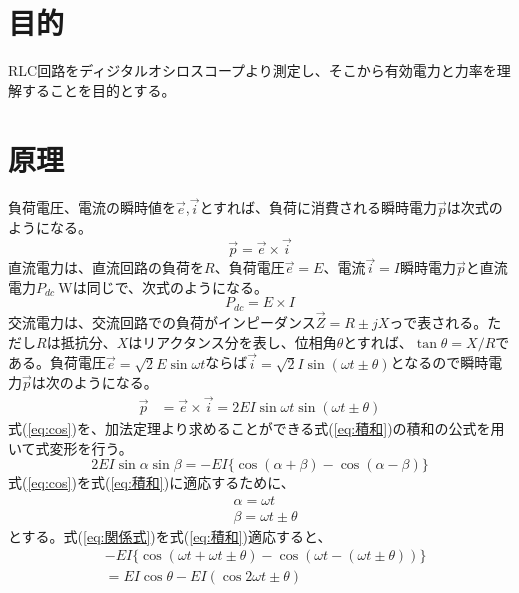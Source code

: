 \documentclass[10pt,a4paper]{jsarticle}
\numberwithin{equation}{section}
\numberwithin{figure}{section}
\numberwithin{table}{section}
\begin{document}
\section{目的}
  RLC回路をディジタルオシロスコープより測定し、そこから有効電力と力率を理解することを目的とする。
\section{原理}
  負荷電圧、電流の瞬時値を$\vec{e}$,$\vec{i}$とすれば、負荷に消費される瞬時電力$\vec{p}$は次式のようになる。
  \begin{equation}
    \vec{p} = \vec{e} \times \vec{i}\label{eq:pei}
  \end{equation}
  直流電力は、直流回路の負荷を$R$、負荷電圧$\vec{e}=E$、電流$\vec{i}=I$瞬時電力$\vec{p}$と直流電力$P_{dc}\:$Wは同じで、次式のようになる。
  \begin{equation}
    P_{dc}=E \times I
  \end{equation}
  交流電力は、交流回路での負荷がインピーダンス$\vec{Z}=R \pm jX$っで表される。ただし$R$は抵抗分、$X$はリアクタンス分を表し、位相角$\theta$とすれば、$\tan\theta = X/R$である。負荷電圧$\vec{e}=\sqrt{2}E\sin\omega t$ならば$\vec{i}=\sqrt{2}I\sin(\omega t \pm \theta)$となるので瞬時電力$\vec{p}$は次のようになる。
  \begin{equation}
    \begin{split}
      \vec{p} &= \vec{e} \times \vec{i}=2 EI \sin \omega t \sin(\omega t \pm \theta)
    \end{split}\label{eq:cos}
  \end{equation}
  式(\ref{eq:cos})を、加法定理より求めることができる式(\ref{eq:積和})の積和の公式を用いて式変形を行う。
  \begin{equation}
    2EI\sin \alpha \sin \beta = -EI\{\cos(\alpha + \beta) - \cos(\alpha - \beta)\}\label{eq:積和}
  \end{equation}
  式(\ref{eq:cos})を式(\ref{eq:積和})に適応するために、
  \begin{equation}
    \begin{split}
      &\alpha = \omega t\\
      &\beta =\omega t \pm \theta\label{eq:関係式}
    \end{split}
  \end{equation}
  とする。式(\ref{eq:関係式})を式(\ref{eq:積和})適応すると、
  \begin{equation}
    \begin{split}
      &-EI\{\cos(\omega t  + \omega t \pm \theta ) - \cos(\omega t  - (\omega t \pm \theta))\} \\
      &=EI\cos\theta - EI(\cos 2\omega t \pm \theta)
    \end{split}
  \end{equation}
\end{document}
